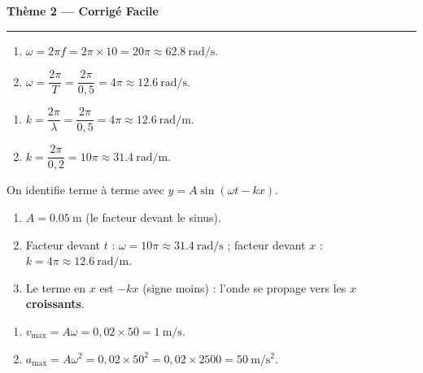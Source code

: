 \documentclass[11pt,a4paper]{article}
\begin{document}
\begin{center}
{\large\bfseries\color{excol} Thème 2 — Corrigé Facile}\\[-2pt]
{\color{excol}\rule{5cm}{1pt}}
\end{center}

\begin{corrige}
\begin{enumerate}[label=\alph*)]
  \item $\omega=2\pi f=2\pi\times 10=20\pi\approx\SI{62.8}{\radian\per\second}.$
  \item $\omega=\dfrac{2\pi}{T}=\dfrac{2\pi}{0{,}5}=4\pi\approx\SI{12.6}{\radian\per\second}.$
\end{enumerate}
\end{corrige}

\begin{corrige}
\begin{enumerate}[label=\alph*)]
  \item $k=\dfrac{2\pi}{\lambda}=\dfrac{2\pi}{0{,}5}=4\pi\approx\SI{12.6}{\radian\per\metre}.$
  \item $k=\dfrac{2\pi}{0{,}2}=10\pi\approx\SI{31.4}{\radian\per\metre}.$
\end{enumerate}
\end{corrige}

\begin{corrige}
On identifie terme à terme avec $y=A\sin(\omega t - kx)$.
\begin{enumerate}[label=\alph*)]
  \item $A=\SI{0.05}{\metre}$ (le facteur devant le sinus).
  \item Facteur devant $t$ : $\omega=10\pi\approx\SI{31.4}{\radian\per\second}$ ;
        facteur devant $x$ : $k=4\pi\approx\SI{12.6}{\radian\per\metre}$.
  \item Le terme en $x$ est $-kx$ (signe moins) : l'onde se propage vers les $x$
        \textbf{croissants}.
\end{enumerate}
\end{corrige}

\begin{corrige}
\begin{enumerate}[label=\alph*)]
  \item $v_{\max}=A\omega=0{,}02\times 50=\SI{1}{\metre\per\second}.$
  \item $a_{\max}=A\omega^{2}=0{,}02\times 50^{2}=0{,}02\times 2500=\SI{50}{\metre\per\second\squared}.$
\end{enumerate}
\end{corrige}
\end{document}

